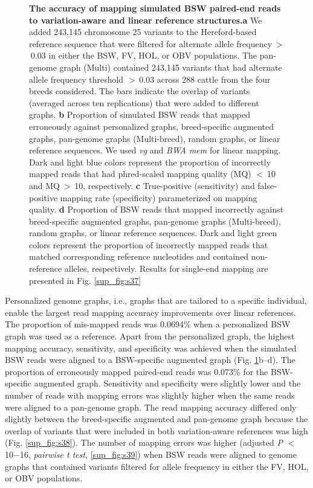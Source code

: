 \documentclass[../main.tex]{subfiles}
\begin{document}
\begin{figure}[!htb]
    \centering
    \caption[Read mapping across cattle graphs combination]{\textbf{The accuracy of mapping simulated BSW paired-end reads to variation-aware and linear reference structures.}\small{\textbf{a} We added 243,145 chromosome 25 variants to the Hereford-based reference sequence that were filtered for alternate allele frequency $>$ 0.03 in either the BSW, FV, HOL, or OBV populations. The pan-genome graph (Multi) contained 243,145 variants that had alternate allele frequency threshold $>$ 0.03 across 288 cattle from the four breeds considered. The bars indicate the overlap of variants (averaged across ten replications) that were added to different graphs. \textbf{b} Proportion of simulated BSW reads that mapped erroneously against personalized graphs, breed-specific augmented graphs, pan-genome graphs (Multi-breed), random graphs, or linear reference sequences. We used \emph{vg} and \emph{BWA mem} for linear mapping. Dark and light blue colors represent the proportion of incorrectly mapped reads that had phred-scaled mapping quality (MQ) $<$ 10 and MQ $>$ 10, respectively. \textbf{c} True-positive (sensitivity) and false-positive mapping rate (specificity) parameterized on mapping quality. \textbf{d} Proportion of BSW reads that mapped incorrectly against breed-specific augmented graphs, pan-genome graphs (Multi-breed), random graphs, or linear reference sequences. Dark and light green colors represent the proportion of incorrectly mapped reads that matched corresponding reference nucleotides and contained non-reference alleles, respectively. Results for single-end mapping are presented in Fig. \ref{sup_fig:s37}}}
    \label{fig34:breed}
\end{figure}


Personalized genome graphs, i.e., graphs that are tailored to a specific individual, enable the largest read mapping accuracy improvements over linear references. The proportion of mis-mapped reads was 0.0694\% when a personalized BSW graph was used as a reference. Apart from the personalized graph, the highest mapping accuracy, sensitivity, and specificity was achieved when the simulated BSW reads were aligned to a BSW-specific augmented graph (Fig. \ref{fig34:breed}b–d). The proportion of erroneously mapped paired-end reads was 0.073\% for the BSW-specific augmented graph. Sensitivity and specificity were slightly lower and the number of reads with mapping errors was slightly higher when the same reads were aligned to a pan-genome graph. The read mapping accuracy differed only slightly between the breed-specific augmented and pan-genome graph because the overlap of variants that were included in both variation-aware references was high (Fig. \ref{sup_fig:s38}). The number of mapping errors was higher (adjusted \emph{P} $<$ 10−16, \emph{pairwise t test}, \ref{sup_fig:s39}) when BSW reads were aligned to genome graphs that contained variants filtered for allele frequency in either the FV, HOL, or OBV populations.
\end{document}

